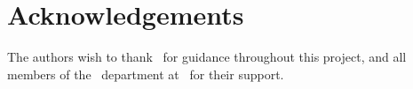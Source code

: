 \chapter*{Acknowledgements}

The authors wish to thank \reportguide\ for guidance throughout this project, and all
members of the \reportdepartment\ department at \reportuniversity\ for their support.
